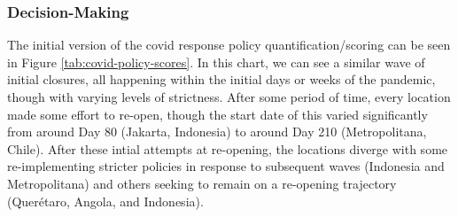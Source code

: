 %
%

\subsubsection{Decision-Making} \label{sec:vida-evdt-decision-results}

The initial version of the \ac{covid} response policy quantification/scoring can be seen in Figure \ref{tab:covid-policy-scores}. In this chart, we can see a similar wave of initial closures, all happening within the initial days or weeks of the pandemic, though with varying levels of strictness. After some period of time, every location made some effort to re-open, though the start date of this varied significantly from around Day 80 (Jakarta, Indonesia) to around Day 210 (Metropolitana, Chile). After these intial attempts at re-opening, the locations diverge with some re-implementing stricter policies in response to subsequent waves (Indonesia and Metropolitana) and others seeking to remain on a re-opening trajectory (Querétaro, Angola, and Indonesia).

